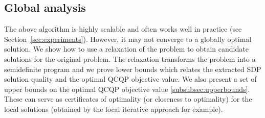 %

\subsection{Global analysis}\label{subsec:globalanalysis}
The above algorithm is highly scalable and often works well in
practice (see Section~\ref{sec:experiments}).
However, it may not converge to a globally optimal
solution.  We show how to use a relaxation of the problem to obtain
candidate solutions for the original problem. The relaxation
transforms the problem into a  semidefinite program and we
 prove  lower bounds which
relates the extracted SDP solution quality and the optimal QCQP
objective value. We also present a set of upper bounds on the optimal QCQP objective value \ref{subsubsec:upperbounds}.
These can serve as certificates of optimality (or closeness to
optimality) for the local solutions (obtained by the local iterative approach for example).

